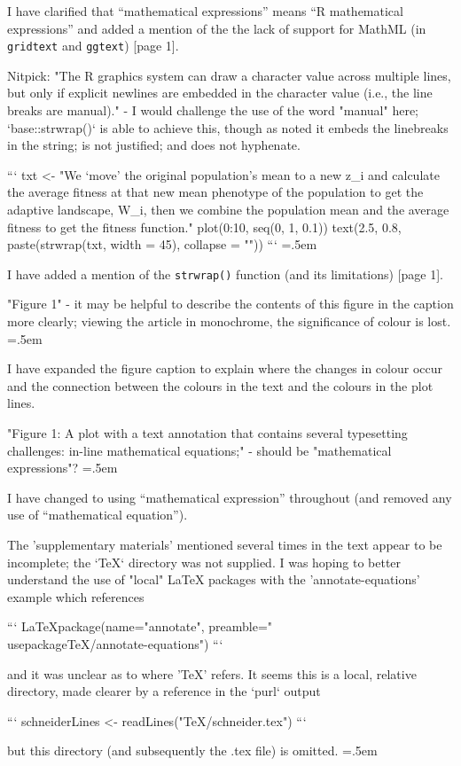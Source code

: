 \documentclass{article}
\newcommand{\code}[1]{\texttt{#1}}
\newenvironment{lcverbatim}
 {\SaveVerbatim{cverb}}
 {\endSaveVerbatim
  \flushleft\fboxrule=0pt\fboxsep=.5em
  \colorbox{cverbbg}{%
    \makebox[\dimexpr\linewidth-2\fboxsep][l]{\BUseVerbatim{cverb}}%
  }
  \endflushleft
}
\begin{document}
I have clarified that ``mathematical expressions'' means ``R mathematical 
expressions'' and added a mention of the the lack of support for MathML
(in \code{gridtext} and \code{ggtext}) [page 1].

\begin{lcverbatim}
  Nitpick: "The R graphics system can draw a character value across multiple
  lines, but only if explicit newlines are embedded in the character value
  (i.e., the line breaks are manual)." - I would challenge the use of the word
  "manual" here; `base::strwrap()` is able to achieve this, though as noted it
  embeds the linebreaks in the string; is not justified; and does not hyphenate.

  ```
  txt <- "We ‘move’ the original population’s mean to a new
  z_i and calculate the average fitness at that new mean
  phenotype of the population to get the adaptive landscape,
  W_i, then we combine the population mean and the average
  fitness to get the fitness function."
  plot(0:10, seq(0, 1, 0.1))
  text(2.5, 0.8, paste(strwrap(txt, width = 45), collapse = "\n"))
  ```
\end{lcverbatim}

I have added a mention of the \code{strwrap()} function
(and its limitations) [page 1].

\begin{lcverbatim}
  "Figure 1" - it may be helpful to describe the contents of this figure in the
  caption more clearly; viewing the article in monochrome, the significance of
  colour is lost.
\end{lcverbatim}

I have expanded the figure caption to explain where the changes in colour occur
and the connection between the colours in the text and the colours in the 
plot lines.

\begin{lcverbatim}
  "Figure 1: A plot with a text annotation that contains several typesetting
  challenges: in-line mathematical equations;" - should be
  "mathematical expressions"?
\end{lcverbatim}

I have changed to using ``mathematical expression'' throughout (and removed any
use of ``mathematical equation'').

\begin{lcverbatim}
  The 'supplementary materials' mentioned several times in the text appear to be
  incomplete; the `TeX` directory was not supplied. I was hoping to better
  understand the use of "local" LaTeX packages with the 'annotate-equations'
  example which references

  ```
  LaTeXpackage(name="annotate",
               preamble="\\usepackage{TeX/annotate-equations}")
  ```

  and it was unclear as to where 'TeX' refers. It seems this is a local, 
  relative directory, made clearer by a reference in the `purl` output

  ```
  schneiderLines <- readLines("TeX/schneider.tex")
  ```

  but this directory (and subsequently the .tex file) is omitted.
\end{lcverbatim}
\end{document}
